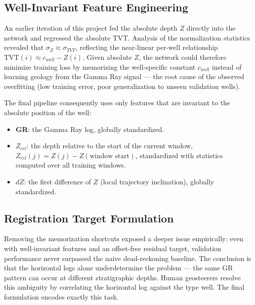 \documentclass[12pt, a4paper]{article}
\begin{document}
    \subsection{Well-Invariant Feature Engineering}
    An earlier iteration of this project fed the absolute depth $Z$ directly into the network and regressed the absolute TVT. Analysis of the normalization statistics revealed that $\sigma_Z \approx \sigma_{TVT}$, reflecting the near-linear per-well relationship $\text{TVT}(i) \approx c_{well} - Z(i)$. Given absolute $Z$, the network could therefore minimize training loss by memorizing the well-specific constant $c_{well}$ instead of learning geology from the Gamma Ray signal --- the root cause of the observed overfitting (low training error, poor generalization to unseen validation wells).

    The final pipeline consequently uses only features that are invariant to the absolute position of the well:
    \begin{itemize}
        \item \textbf{GR}: the Gamma Ray log, globally standardized.
        \item \textbf{$Z_{rel}$}: the depth relative to the start of the current window, $Z_{rel}(j) = Z(j) - Z(\text{window start})$, standardized with statistics computed over all training windows.
        \item \textbf{$dZ$}: the first difference of $Z$ (local trajectory inclination), globally standardized.
    \end{itemize}

    \subsection{Registration Target Formulation}
    Removing the memorization shortcuts exposed a deeper issue empirically: even with well-invariant features and an offset-free residual target, validation performance never surpassed the naive dead-reckoning baseline. The conclusion is that the horizontal logs alone underdetermine the problem --- the same GR pattern can occur at different stratigraphic depths. Human geosteerers resolve this ambiguity by correlating the horizontal log against the type well. The final formulation encodes exactly this task.
\end{document}
